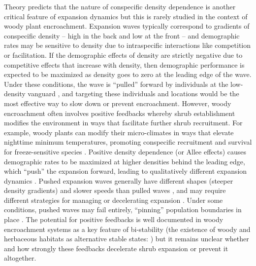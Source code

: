 \documentclass[11pt]{article}\usepackage[]{graphicx}\usepackage[usenames,dvipsnames]{xcolor}
\begin{document}
Theory predicts that the nature of conspecific density dependence is another critical feature of expansion dynamics but this is rarely studied in the context of woody plant encroachment.  
Expansion waves typically correspond to gradients of conspecific density -- high in the back and low at the front -- and demographic rates may be sensitive to density due to intraspecific interactions like competition or facilitation.
If the demographic effects of density are strictly negative due to competitive effects that increase with density, then demographic performance is expected to be maximized as density goes to zero at the leading edge of the wave. 
Under these conditions, the wave is ``pulled'' forward by individuals at the low-density vanguard \citep{kot1996dispersal}, and targeting these individuals and locations would be the most effective way to slow down or prevent encroachment. 
However, woody encroachment often involves positive feedbacks whereby shrub establishment modifies the environment in ways that facilitate further shrub recruitment. 
For example, woody plants can modify their micro-climates in ways that elevate nighttime minimum temperatures, promoting conspecific recruitment and survival for freeze-sensitive species \citep{d2013vegetation,huang2020critical}. 
Positive density dependence (or Allee effects) causes demographic rates to be maximized at higher densities behind the leading edge, which ``push'' the expansion forward, leading to qualitatively different expansion dynamics \citep{kot1996dispersal, taylor2005allee, sullivan2017density, lewis1993allee, veit1996dispersal}.
Pushed expansion waves generally have different shapes (steeper density gradients) and slower speeds than pulled waves \citep{gandhi2016range}, and may require different strategies for managing or decelerating expansion \citep{taylor2005allee}. 
Under some conditions, pushed waves may fail entirely, ``pinning'' population boundaries in place \citep{keitt2001allee}. 
The potential for positive feedbacks is well documented in woody encroachment systems as a key feature of bi-stability (the existence of woody and herbaceous habitats as alternative stable states: \cite{wilcox2018emerging}) but it remains unclear whether and how strongly these feedbacks decelerate shrub expansion or prevent it altogether.
\end{document}
